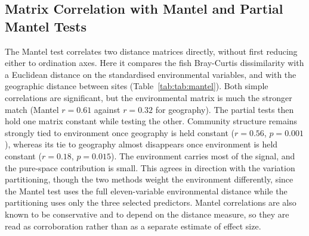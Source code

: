 \documentclass[11pt]{article}
\begin{document}
\subsection{Matrix Correlation with Mantel and Partial Mantel Tests}
The Mantel test correlates two distance matrices directly, without first reducing either to ordination axes. Here it compares the fish Bray-Curtis dissimilarity with a Euclidean distance on the standardised environmental variables, and with the geographic distance between sites (Table~\ref{tab:tab:mantel}). Both simple correlations are significant, but the environmental matrix is much the stronger match (Mantel $r = 0.61$ against $r = 0.32$ for geography). The partial tests then hold one matrix constant while testing the other. Community structure remains strongly tied to environment once geography is held constant ($r = 0.56$, $p = 0.001$), whereas its tie to geography almost disappears once environment is held constant ($r = 0.18$, $p = 0.015$). The environment carries most of the signal, and the pure-space contribution is small. This agrees in direction with the variation partitioning, though the two methods weight the environment differently, since the Mantel test uses the full eleven-variable environmental distance while the partitioning uses only the three selected predictors. Mantel correlations are also known to be conservative and to depend on the distance measure, so they are read as corroboration rather than as a separate estimate of effect size.
\begin{table}[!h]
\centering
\caption{\label{tab:tab:mantel}Mantel and partial Mantel correlations among the fish, environmental, and geographic distance matrices, with 999 permutations.}
\centering
{}
\end{table}
\end{document}
